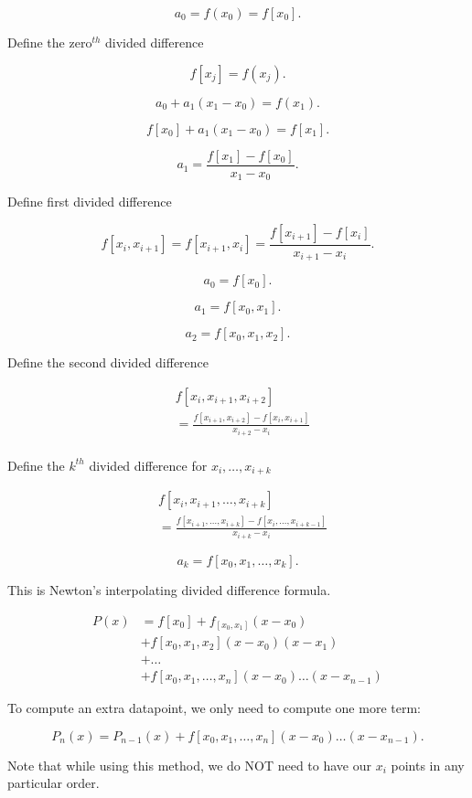 \[
  a_0 = f(x_0) = f[x_0]
.\]

Define the zero$^{th}$ divided difference

\[
  f[x_j] = f(x_j)
.\]

\[
a_0 + a_1(x_1-x_0) = f(x_1)
.\]

\[
  f[x_0] + a_1 (x_1-x_0) = f[x_1]
.\]

\[
a_1 = \frac{f[x_1] - f[x_0]}{x_1-x_0}
.\]

Define first divided difference

\[
  f[x_i, x_{i+1}] = f[x_{i+1}, x_i] = \frac{f[x_{i+1}]-f[x_i]}{x_{i+1}-x_i}
.\]

\[
  a_0 = f[x_0]
.\]

\[
  a_1 = f[x_0, x_1]
.\]

\[
  a_2 = f[x_0, x_1, x_2]
.\]

Define the second divided difference

\begin{align*}
  &f[x_i, x_{i+1}, x_{i+2}] \\
  &= \frac{f[x_{i+1}, x_{i+2}] - f[x_i, x_{i+1}]}{x_{i+2}-x_i} \\
\end{align*}

Define the $k^{th}$ divided difference for $x_i, \dots, x_{i+k}$

\begin{align*}
  &f[x_i, x_{i+1}, \dots, x_{i+k}] \\
  &= \frac{f[x_{i+1}, \dots, x_{i+k}] - f[x_i, \dots, x_{i+k-1}]}{x_{i+k}-x_i} 
\end{align*}

\[
  a_k = f[x_0, x_1, \dots, x_k]
.\]

This is Newton's interpolating divided difference formula.


\begin{align*}
  P(x) &= f[x_0] + f_[x_0, x_1] (x-x_0) \\
       &+ f[x_0, x_1, x_2] (x-x_0) (x-x_1) \\
       &+ \dots \\
       &+ f[x_0, x_1, \dots, x_n](x-x_0) \dots (x-x_{n-1})
\end{align*}

To compute an extra datapoint, we only need to compute one more term:

\[
  P_n(x) = P_{n-1}(x) + f[x_0, x_1, \dots, x_n](x-x_0) \dots (x-x_{n-1})
.\]

Note that while using this method, we do NOT need to have our $x_i$ points in
any particular order.

